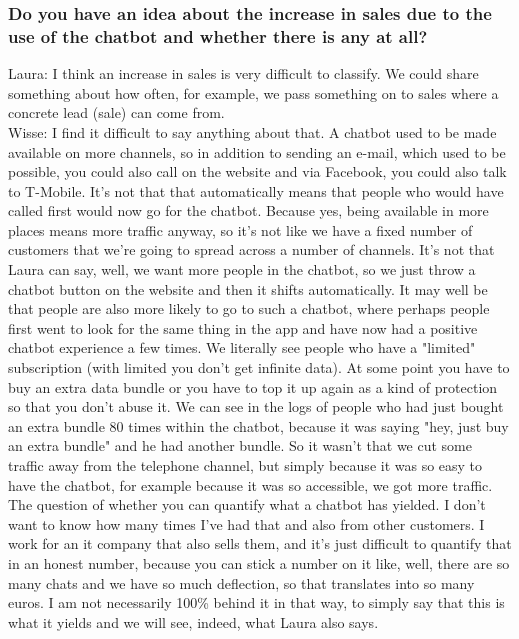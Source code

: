 \begin{appendices}
	\subsubsection{Do you have an idea about the increase in sales due to the use of the chatbot
		and whether there is any at all?}
	Laura: I think an increase in sales is very difficult to classify. We could share something about how often, for example, we pass something on to sales where a concrete lead (sale) can come from.\\
	\break
	Wisse: I find it difficult to say anything about that. A chatbot used to be made available on more channels, so in addition to sending an e-mail, which used to be possible, you could also call on the website and via Facebook, you could also talk to T-Mobile. It's not that that automatically means that people who would have called first would now go for the chatbot. Because yes, being available in more places means more traffic anyway, so it's not like we have a fixed number of customers that we're going to spread across a number of channels. It's not that Laura can say, well, we want more people in the chatbot, so we just throw a chatbot button on the website and then it shifts automatically. It may well be that people are also more likely to go to such a chatbot, where perhaps people first went to look for the same thing in the app and have now had a positive chatbot experience a few times. We literally see people who have a "limited" subscription (with limited you don't get infinite data). At some point you have to buy an extra data bundle or you have to top it up again as a kind of protection so that you don't abuse it. We can see in the logs of people who had just bought an extra bundle 80 times within the chatbot, because it was saying "hey, just buy an extra bundle" and he had another bundle. So it wasn't that we cut some traffic away from the telephone channel, but simply because it was so easy to have the chatbot, for example because it was so accessible, we got more traffic. The question of whether you can quantify what a chatbot has yielded. I don't want to know how many times I've had that and also from other customers. I work for an \acrshort{it} company that also sells them, and it's just difficult to quantify that in an honest number, because you can stick a number on it like, well, there are so many chats and we have so much deflection, so that translates into so many euros. I am not necessarily 100\% behind it in that way, to simply say that this is what it yields and we will see, indeed, what Laura also says.\\

\end{appendices}
